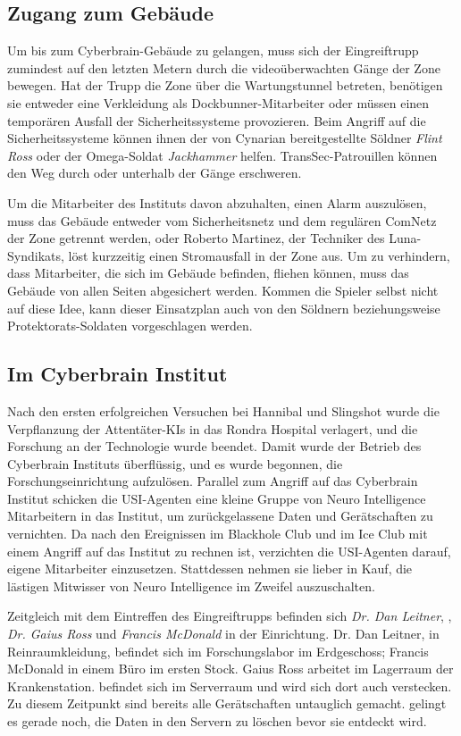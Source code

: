 \subsection{Zugang zum Gebäude} 
Um bis zum Cyberbrain-Gebäude zu gelangen, muss sich der Eingreiftrupp zumindest auf den letzten Metern durch die videoüberwachten Gänge der Zone bewegen. Hat der Trupp die Zone über die Wartungstunnel betreten, benötigen sie entweder eine Verkleidung als Dockbunner-Mitarbeiter oder müssen einen temporären Ausfall der Sicherheitssysteme provozieren. Beim Angriff auf die Sicherheitssysteme können ihnen der von Cynarian bereitgestellte Söldner \emph{Flint Ross} oder der Omega-Soldat \emph{Jackhammer} helfen. TransSec-Patrouillen können den Weg durch oder unterhalb der Gänge erschweren.

Um die Mitarbeiter des Instituts davon abzuhalten, einen Alarm auszulösen, muss das Gebäude entweder vom Sicherheitsnetz und dem regulären ComNetz der Zone getrennt werden, oder Roberto Martinez, der Techniker des Luna-Syndikats, löst kurzzeitig einen Stromausfall in der Zone aus. Um zu verhindern, dass Mitarbeiter, die sich im Gebäude befinden, fliehen können, muss das Gebäude von allen Seiten abgesichert werden. Kommen die Spieler selbst nicht auf diese Idee, kann dieser Einsatzplan auch von den Söldnern beziehungsweise Protektorats-Soldaten vorgeschlagen werden.

\subsection{Im Cyberbrain Institut}
Nach den ersten erfolgreichen Versuchen bei Hannibal und Slingshot wurde die Verpflanzung der Attentäter-KIs in das Rondra Hospital verlagert, und die Forschung an der Technologie wurde beendet. Damit wurde der Betrieb des Cyberbrain Instituts überflüssig, und es wurde begonnen, die Forschungseinrichtung aufzulösen. Parallel zum Angriff auf das Cyberbrain Institut schicken die USI-Agenten eine kleine Gruppe von Neuro Intelligence Mitarbeitern in das Institut, um zurückgelassene Daten und Gerätschaften zu vernichten. Da nach den Ereignissen im Blackhole Club und im Ice Club mit einem Angriff auf das Institut zu rechnen ist, verzichten die USI-Agenten darauf, eigene Mitarbeiter einzusetzen. Stattdessen nehmen sie lieber in Kauf, die lästigen Mitwisser von Neuro Intelligence im Zweifel auszuschalten.

Zeitgleich mit dem Eintreffen des Eingreiftrupps befinden sich \emph{Dr. Dan Leitner}, \emph{\ml{}}, \emph{Dr. Gaius Ross} und \emph{Francis McDonald} in der Einrichtung. Dr. Dan Leitner, in Reinraumkleidung, befindet sich im Forschungslabor im Erdgeschoss; Francis McDonald in einem Büro im ersten Stock. Gaius Ross arbeitet im Lagerraum der Krankenstation. \ml{} befindet sich im Serverraum und wird sich dort auch verstecken. Zu diesem Zeitpunkt sind bereits alle Gerätschaften untauglich gemacht. \ml{} gelingt es gerade noch, die Daten in den Servern zu löschen bevor sie entdeckt wird.

